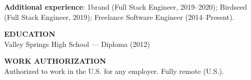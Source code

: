 \documentclass[10pt]{article}
\begin{document}
\textbf{Additional experience}: 1brand (Full Stack Engineer, 2019--2020); Birdseed (Full Stack Engineer, 2019); Freelance Software Engineer (2014--Present).

\vspace{6pt}
\textbf{EDUCATION}\\
Valley Springs High School --- Diploma (2012)

\vspace{2pt}
\textbf{WORK AUTHORIZATION}\\
Authorized to work in the U.S. for any employer. Fully remote (U.S.).
\end{document}
